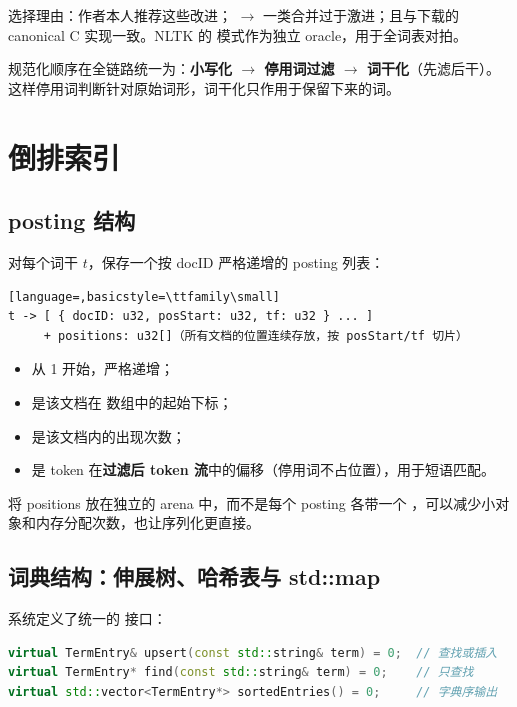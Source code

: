选择理由：作者本人推荐这些改进； $\rightarrow$  一类合并过于激进；且与下载的 canonical C 实现一致。NLTK 的  模式作为独立 oracle，用于全词表对拍。

规范化顺序在全链路统一为：\textbf{小写化 $\rightarrow$ 停用词过滤 $\rightarrow$ 词干化}（先滤后干）。这样停用词判断针对原始词形，词干化只作用于保留下来的词。

\section{倒排索引}

\subsection{posting 结构}

对每个词干 $t$，保存一个按 docID 严格递增的 posting 列表：

\begin{lstlisting}[language=,basicstyle=\ttfamily\small]
t -> [ { docID: u32, posStart: u32, tf: u32 } ... ]
     + positions: u32[]（所有文档的位置连续存放，按 posStart/tf 切片）
\end{lstlisting}

\begin{itemize}
  \item {} 从 1 开始，严格递增；
  \item {} 是该文档在  数组中的起始下标；
  \item {} 是该文档内的出现次数；
  \item {} 是 token 在\textbf{过滤后 token 流}中的偏移（停用词不占位置），用于短语匹配。
\end{itemize}

将 positions 放在独立的 arena 中，而不是每个 posting 各带一个 ，可以减少小对象和内存分配次数，也让序列化更直接。

\subsection{词典结构：伸展树、哈希表与 std::map}

系统定义了统一的  接口：

\begin{lstlisting}[language=C++]
virtual TermEntry& upsert(const std::string& term) = 0;  // 查找或插入
virtual TermEntry* find(const std::string& term) = 0;    // 只查找
virtual std::vector<TermEntry*> sortedEntries() = 0;     // 字典序输出
\end{lstlisting}

